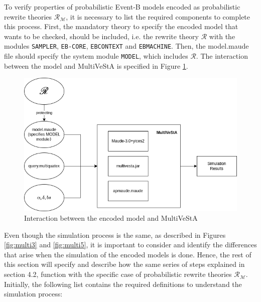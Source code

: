 To verify properties of probabilistic Event-B models encoded as probabilistic rewrite theories $\mathscr{R}_\mathscr{M}$, it is necessary to list the required components to complete this process. First, the mandatory theory to specify the encoded model that wants to be checked, should be included, i.e. the rewrite theory $\mathscr{R}$ with the modules \texttt{SAMPLER}, \texttt{EB-CORE}, \texttt{EBCONTEXT} and \texttt{EBMACHINE}. Then, the model.maude file should specify the system module \texttt{MODEL}, which includes $\mathscr{R}$. The interaction between the model and MultiVeStA is specified in Figure \ref{fig:multi6}.       
\begin{figure}[H]
    \centering
    \includegraphics[scale = 0.5]{images/multi6.png}
    \caption{Interaction between the encoded model and MultiVeStA}
    \label{fig:multi6}
\end{figure}
Even though the simulation process is the same, as described in Figures \ref{fig:multi3} and \ref{fig:multi5}, it is important to consider and identify the differences that arise when the simulation of the encoded models is done. Hence, the rest of this section will specify and describe how the same series of steps explained in section 4.2, function with the specific case of probabilistic rewrite theories $\mathscr{R}_\mathscr{M}$. Initially, the following list contains the required definitions to understand the simulation process:
